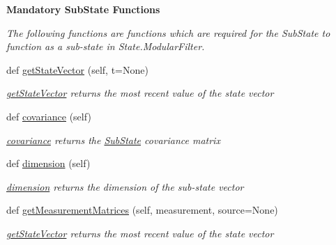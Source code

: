 \begin{Indent}{\bf Mandatory Sub\+State Functions}\par
{\em The following functions are functions which are required for the Sub\+State to function as a sub-\/state in State.\+Modular\+Filter. }\begin{DoxyCompactItemize}
\item 
def \hyperlink{classmodest_1_1substates_1_1substate_1_1SubState_a1d8050de59c58969164f577899a55aa2}{get\+State\+Vector} (self, t=None)
\begin{DoxyCompactList}\small\item\em \hyperlink{classmodest_1_1substates_1_1substate_1_1SubState_a1d8050de59c58969164f577899a55aa2}{get\+State\+Vector} returns the most recent value of the state vector \end{DoxyCompactList}\item 
def \hyperlink{classmodest_1_1substates_1_1substate_1_1SubState_a6e308aadd13962e476d2892ec728e3a5}{covariance} (self)
\begin{DoxyCompactList}\small\item\em \hyperlink{classmodest_1_1substates_1_1substate_1_1SubState_a6e308aadd13962e476d2892ec728e3a5}{covariance} returns the \hyperlink{classmodest_1_1substates_1_1substate_1_1SubState}{Sub\+State} covariance matrix \end{DoxyCompactList}\item 
def \hyperlink{classmodest_1_1substates_1_1substate_1_1SubState_ab9027f6d1d7d57c47731612f519b7ee6}{dimension} (self)
\begin{DoxyCompactList}\small\item\em \hyperlink{classmodest_1_1substates_1_1substate_1_1SubState_ab9027f6d1d7d57c47731612f519b7ee6}{dimension} returns the dimension of the sub-\/state vector \end{DoxyCompactList}\item 
def \hyperlink{classmodest_1_1substates_1_1substate_1_1SubState_a98901b80c96264945362ec50b489a636}{get\+Measurement\+Matrices} (self, measurement, source=None)
\begin{DoxyCompactList}\small\item\em \hyperlink{classmodest_1_1substates_1_1substate_1_1SubState_a1d8050de59c58969164f577899a55aa2}{get\+State\+Vector} returns the most recent value of the state vector \end{DoxyCompactList}\end{DoxyCompactItemize}
\end{Indent}
